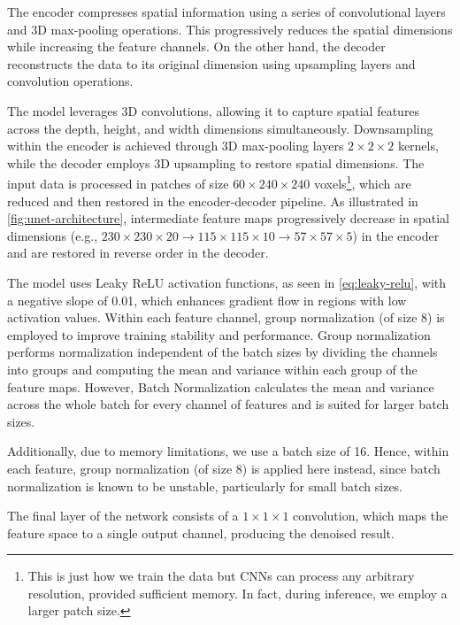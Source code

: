 The encoder compresses spatial information using a series of convolutional layers and 3D max-pooling operations. This progressively reduces the spatial dimensions while increasing the feature channels. On the other hand, the decoder reconstructs the data to its original dimension using upsampling layers and convolution operations. 

The model leverages 3D convolutions, allowing it to capture spatial features across the depth, height, and width dimensions simultaneously. Downsampling within the encoder is achieved through 3D max-pooling layers $2 \times 2 \times 2$ kernels, while the decoder employs 3D upsampling to restore spatial dimensions. The input data is processed in patches of size $60 \times 240 \times 240$ voxels\footnote{This is just how we train the data but \glspl{CNN} can process any arbitrary resolution, provided sufficient memory. In fact, during inference, we employ a larger patch size.}, which are reduced and then restored in the encoder-decoder pipeline. As illustrated in \cref{fig:unet-architecture}, intermediate feature maps progressively decrease in spatial dimensions (e.g., $230 \times 230 \times 20 \to 115 \times 115 \times 10 \to 57 \times 57 \times 5$) in the encoder and are restored in reverse order in the decoder. 

The model uses Leaky ReLU activation functions, as seen in \cref{eq:leaky-relu}, with a negative slope of 0.01, which enhances gradient flow in regions with low activation values. Within each feature channel, group normalization (of size 8) is employed to improve training stability and performance. Group normalization performs normalization independent of the batch sizes by dividing the channels into groups and computing the mean and variance within each group of the feature maps\cite{wuGroupNormalization2018}. However, Batch Normalization calculates the mean and variance across the whole batch for every channel of features and is suited for larger batch sizes.

Additionally, due to memory limitations, we use a batch size of \num{16}. Hence, within each feature, group normalization (of size 8) is applied here instead, since batch normalization is known to be unstable, particularly for small batch sizes.

The final layer of the network consists of a $1 \times 1 \times 1$ convolution, which maps the feature space to a single output channel, producing the denoised result.


